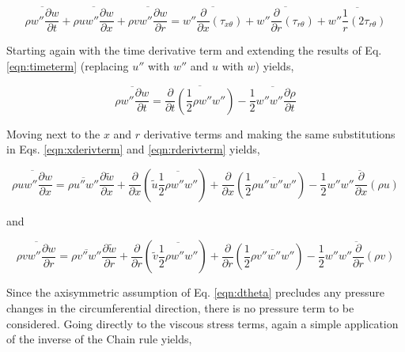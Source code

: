\begin{equation}
	\overline{\rho w'' \frac{\partial w}{\partial t}} + \overline{\rho u w'' \frac{\partial w}{\partial x}} 
	+ \overline{\rho v w'' \frac{\partial w}{\partial r}}  
	= \overline{w''\frac{\partial}{\partial x}(\tau_{x \theta})} 
	+ \overline{w''\frac{\partial}{\partial r}(\tau_{r \theta})} 
	+ \overline{w''\frac{1}{r}(2\tau_{r \theta})}
\label{eqn:wthetamomshear}
\end{equation}

	Starting again with the time derivative term and extending the results of Eq. \ref{eqn:timeterm} (replacing 
$u''$ with $w''$ and $u$ with $w$) yields,

\begin{equation}
	\overline{\rho w'' \frac{\partial w}{\partial t}} = \overline{\frac{\partial}{\partial t}
	(\frac{1}{2}\rho w'' w'')} - \overline{\frac{1}{2}w''w''\frac{\partial \rho}{\partial t}}	
\label{eqn:timeterm3}
\end{equation}
	
	Moving next to the $x$ and $r$ derivative terms and making the same substitutions in Eqs. \ref{eqn:xderivterm}
and \ref{eqn:rderivterm} yields,

\begin{equation}
	\overline{\rho u w'' \frac{\partial w}{\partial x}} = \overline{\rho u'' w''}\frac{\partial \tilde w}{\partial x}
	+ \frac{\partial}{\partial x}(\tilde u \overline{\frac{1}{2}\rho w'' w''}) + \frac{\partial}{\partial x}(\frac{1}{2}
	\overline{\rho u'' w'' w''})- \overline{\frac{1}{2}w''w''\frac{\partial}{\partial x}(\rho u)}
\label{eqn:xderivterm3}
\end{equation}

	and

\begin{equation}
	\overline{\rho v w'' \frac{\partial w}{\partial r}} = \overline{\rho v'' w''}\frac{\partial \tilde w}{\partial r}
	+ \frac{\partial}{\partial r}(\tilde v \overline{\frac{1}{2}\rho w'' w''}) + \frac{\partial}{\partial r}(\frac{1}{2}
	\overline{\rho v'' w'' w''})- \overline{\frac{1}{2}w''w''\frac{\partial}{\partial r}(\rho v)}
\label{eqn:rderivterm3}
\end{equation}

	Since the axisymmetric assumption of Eq. \ref{eqn:dtheta} precludes any pressure changes in the circumferential
direction, there is no pressure term to be considered.  Going directly to the viscous stress terms, again a simple 
application of the inverse of the Chain rule yields,

